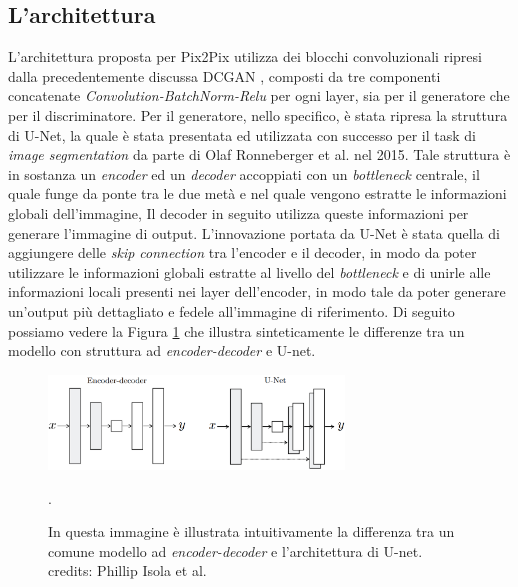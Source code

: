 \subsection{L'architettura}
L'architettura proposta per Pix2Pix utilizza dei blocchi convoluzionali ripresi dalla precedentemente discussa DCGAN \cite{radford2016unsupervised},
composti da tre componenti concatenate \textit{Convolution-BatchNorm-Relu} per ogni layer, sia per il generatore che per il discriminatore.
Per il generatore, nello specifico, è stata ripresa la struttura di U-Net, la quale è stata presentata ed utilizzata con successo per il task di \textit{image segmentation}
da parte di Olaf Ronneberger et al. \cite{ronneberger2015unet} nel 2015.
Tale struttura è in sostanza un \textit{encoder} ed un \textit{decoder} accoppiati con un \textit{bottleneck} centrale, il quale funge 
da ponte tra le due metà e nel quale vengono estratte le informazioni globali dell'immagine, Il decoder in seguito utilizza queste informazioni
per generare l'immagine di output. L'innovazione portata da U-Net è stata quella di aggiungere delle \textit{skip connection} tra l'encoder e il decoder,
in modo da poter utilizzare le informazioni globali estratte al livello del \textit{bottleneck} e di unirle alle informazioni locali presenti nei layer
dell'encoder, in modo tale da poter generare un'output più dettagliato e fedele all'immagine di riferimento. 
Di seguito possiamo vedere la Figura \ref{fig:encoder_decode_unet} che illustra sinteticamente  le differenze tra un modello con struttura ad \textit{encoder-decoder} e U-net.

    \begin{figure}[H]
        \centering
        \includegraphics[width=0.7\textwidth]{imgs/encoder_decoder_unet.png}
        \caption{In questa immagine è illustrata intuitivamente la differenza tra un comune modello ad \textit{encoder-decoder} e l'architettura di U-net.\\
        credits: Phillip Isola et al. \cite{isola2018imagetoimage}}.
        \label{fig:encoder_decode_unet}
    \end{figure}

